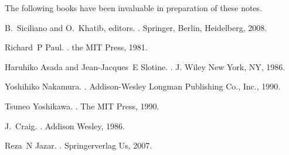\newpage
\begin{thebibliography}{1}

 The following books have been invaluable in preparation of these notes.


B.~Siciliano and O.~Khatib, editors.
.
\newblock Springer, Berlin, Heidelberg, 2008.

Richard~P Paul.
.
\newblock the MIT Press, 1981.

Haruhiko Asada and Jean-Jacques~E Slotine.
.
\newblock J. Wiley New York, NY, 1986.

Yoshihiko Nakamura.
.
\newblock Addison-Wesley Longman Publishing Co., Inc., 1990.

Tsuneo Yoshikawa.
.
\newblock The MIT Press, 1990.

J.~Craig.
.
\newblock Addison Wesley, 1986.

Reza~N Jazar.
.
\newblock Springerverlag Us, 2007.

\end{thebibliography}










%
%
%
